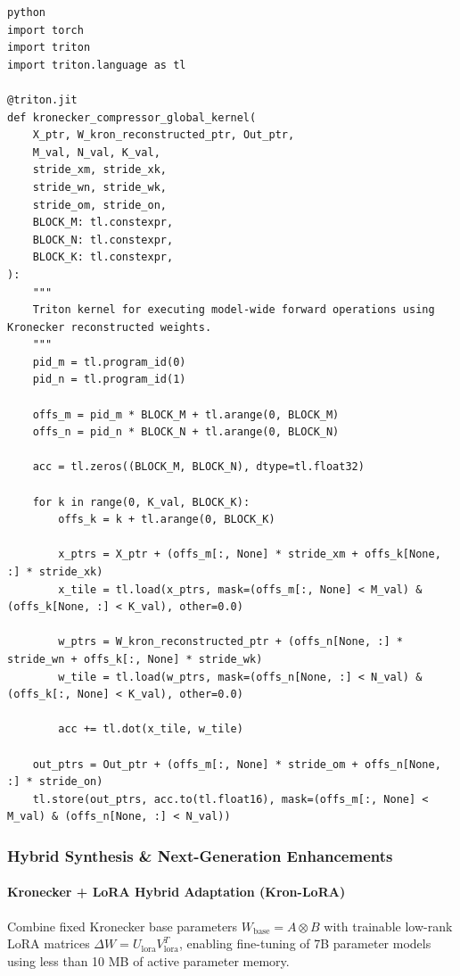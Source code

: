 \vspace{0.5em}
\begin{mdframed}[backgroundcolor=codebg, linecolor=codeframe, linewidth=1pt, roundcorner=4pt, innerleftmargin=2pt, innerrightmargin=5pt, innertopmargin=5pt, innerbottommargin=5pt]
\begin{lstlisting}
python
import torch
import triton
import triton.language as tl

@triton.jit
def kronecker_compressor_global_kernel(
    X_ptr, W_kron_reconstructed_ptr, Out_ptr,
    M_val, N_val, K_val,
    stride_xm, stride_xk,
    stride_wn, stride_wk,
    stride_om, stride_on,
    BLOCK_M: tl.constexpr,
    BLOCK_N: tl.constexpr,
    BLOCK_K: tl.constexpr,
):
    """
    Triton kernel for executing model-wide forward operations using Kronecker reconstructed weights.
    """
    pid_m = tl.program_id(0)
    pid_n = tl.program_id(1)

    offs_m = pid_m * BLOCK_M + tl.arange(0, BLOCK_M)
    offs_n = pid_n * BLOCK_N + tl.arange(0, BLOCK_N)

    acc = tl.zeros((BLOCK_M, BLOCK_N), dtype=tl.float32)

    for k in range(0, K_val, BLOCK_K):
        offs_k = k + tl.arange(0, BLOCK_K)

        x_ptrs = X_ptr + (offs_m[:, None] * stride_xm + offs_k[None, :] * stride_xk)
        x_tile = tl.load(x_ptrs, mask=(offs_m[:, None] < M_val) & (offs_k[None, :] < K_val), other=0.0)

        w_ptrs = W_kron_reconstructed_ptr + (offs_n[None, :] * stride_wn + offs_k[:, None] * stride_wk)
        w_tile = tl.load(w_ptrs, mask=(offs_n[None, :] < N_val) & (offs_k[:, None] < K_val), other=0.0)

        acc += tl.dot(x_tile, w_tile)

    out_ptrs = Out_ptr + (offs_m[:, None] * stride_om + offs_n[None, :] * stride_on)
    tl.store(out_ptrs, acc.to(tl.float16), mask=(offs_m[:, None] < M_val) & (offs_n[None, :] < N_val))
\end{lstlisting}
\end{mdframed}
\vspace{0.5em}


\subsubsection*{Hybrid Synthesis \& Next-Generation Enhancements}

\paragraph{Kronecker + LoRA Hybrid Adaptation (Kron-LoRA)}
Combine fixed Kronecker base parameters $W_{\text{base}} = A \otimes B$ with trainable low-rank LoRA matrices $\Delta W = U_{\text{lora}} V_{\text{lora}}^T$, enabling fine-tuning of 7B parameter models using less than 10 MB of active parameter memory.

